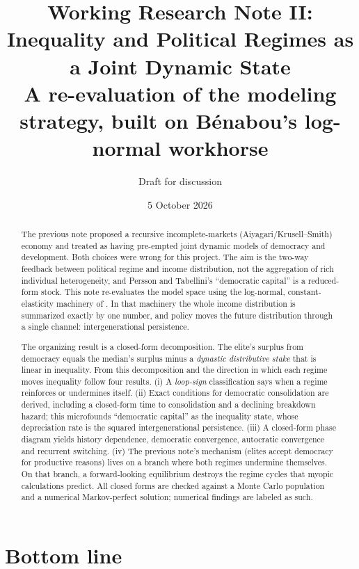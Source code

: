 \documentclass[11pt]{article}
\title{Working Research Note II:\\Inequality and Political Regimes as a Joint Dynamic State\\[0.3em]
\large A re-evaluation of the modeling strategy, built on B\'enabou's log-normal workhorse}
\author{Draft for discussion}
\date{5 October 2026}
\theoremstyle{remark}
\begin{document}
\maketitle

\begin{abstract}
The previous note proposed a recursive incomplete-markets (Aiyagari/Krusell--Smith) economy and treated \citet{PerssonTabellini2009} as having pre-empted joint dynamic models of democracy and development.  Both choices were wrong for this project.  The aim is the two-way feedback between political regime and income distribution, not the aggregation of rich individual heterogeneity, and Persson and Tabellini's ``democratic capital'' is a reduced-form stock.  This note re-evaluates the model space using the log-normal, constant-elasticity machinery of \citet{Benabou1996,Benabou2000,Benabou2002}.  In that machinery the whole income distribution is summarized exactly by one number, and policy moves the future distribution through a single channel: intergenerational persistence.

The organizing result is a closed-form decomposition.  The elite's surplus from democracy equals the median's surplus minus a \emph{dynastic distributive stake} that is linear in inequality.  From this decomposition and the direction in which each regime moves inequality follow four results.  (i) A \emph{loop-sign} classification says when a regime reinforces or undermines itself.  (ii) Exact conditions for democratic consolidation are derived, including a closed-form time to consolidation and a declining breakdown hazard; this microfounds ``democratic capital'' as the inequality state, whose depreciation rate is the squared intergenerational persistence.  (iii) A closed-form phase diagram yields history dependence, democratic convergence, autocratic convergence and recurrent switching.  (iv) The previous note's mechanism (elites accept democracy for productive reasons) lives on a branch where both regimes undermine themselves.  On that branch, a forward-looking equilibrium destroys the regime cycles that myopic calculations predict.  All closed forms are checked against a Monte Carlo population and a numerical Markov-perfect solution; numerical findings are labeled as such.
\end{abstract}

\tableofcontents
\newpage

\section{Bottom line}
\end{document}
